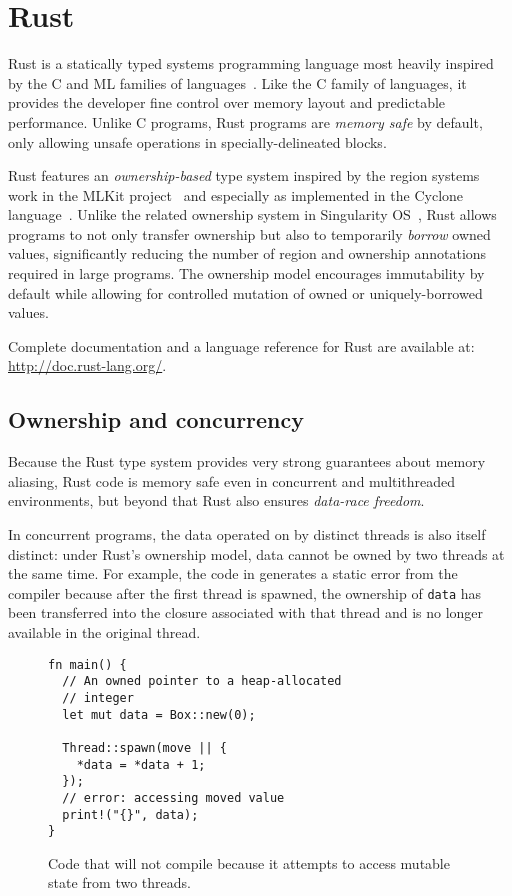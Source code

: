 
\section{Rust}
\label{sec:rust}

Rust is a statically typed systems programming language most heavily inspired by the C
and ML families of languages~\cite{RUST}.
Like the C family of languages, it provides the developer fine control over memory layout
and predictable performance.
Unlike C programs, Rust programs are \emph{memory safe} by default,
only allowing unsafe operations in specially-delineated blocks.

Rust features an \emph{ownership-based} type system inspired by the region systems work in the
MLKit project~\cite{mlkit} and especially as implemented in the Cyclone language~\cite{cyclone}.
Unlike the related ownership system in Singularity OS~\cite{singularity}, Rust allows programs to
not only transfer ownership but also to temporarily \emph{borrow} owned values, significantly
reducing the number of region and ownership annotations required in large programs.
The ownership model encourages immutability by default while allowing for controlled
mutation of owned or uniquely-borrowed values.

Complete documentation and a language reference for Rust are available at: \url{http://doc.rust-lang.org/}.

\subsection{Ownership and concurrency}
Because the Rust type system provides very strong guarantees about memory aliasing,
Rust code is memory safe even in concurrent and multithreaded environments,
but beyond that Rust also ensures \emph{data-race freedom}.

In concurrent programs, the data operated on by distinct threads is also itself distinct:
under Rust's ownership model, data cannot be owned by two threads at the same time.
For example, the code in  generates a static error from the compiler because
after the first thread is spawned, the ownership of \lstinline{data} has been transferred into the
closure associated with that thread and is no longer available in the original thread.
\begin{figure}
\begin{lstlisting}
fn main() {
  // An owned pointer to a heap-allocated
  // integer
  let mut data = Box::new(0);

  Thread::spawn(move || {
    *data = *data + 1;
  });
  // error: accessing moved value
  print!("{}", data);
}
\end{lstlisting}
  \caption{Code that will not compile because it attempts to access mutable state from two threads.}
  \label{fig:bad-concurrency}
\end{figure}

